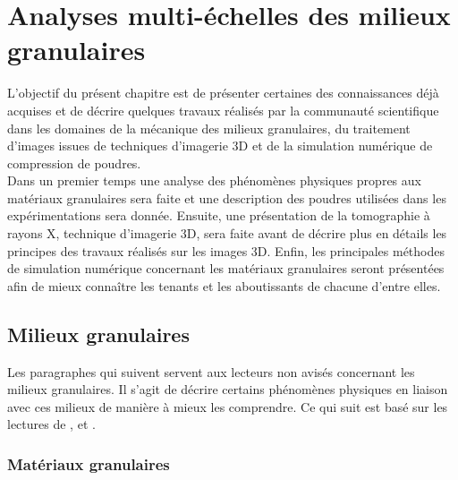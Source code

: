 \graphicspath{{./03-Biblio/images/}}

\chapter{Analyses multi-échelles des milieux granulaires}
\label{chap:biblio}


L'objectif du présent chapitre est de présenter certaines des connaissances déjà acquises et de décrire quelques travaux réalisés par la communauté scientifique dans les domaines de la mécanique des milieux granulaires, du traitement d'images issues de techniques d'imagerie 3D et de la simulation numérique de compression de poudres.
\\Dans un premier temps une analyse des phénomènes physiques propres aux matériaux granulaires sera faite et une description des poudres utilisées dans les expérimentations sera donnée. Ensuite, une présentation de la tomographie à rayons X, technique d'imagerie 3D, sera faite avant de décrire plus en détails les principes des travaux réalisés sur les images 3D. Enfin, les principales méthodes de simulation numérique concernant les matériaux granulaires seront présentées afin de mieux connaître les tenants et les aboutissants de chacune d'entre elles.

\section{Milieux granulaires}
	Les paragraphes qui suivent servent aux lecteurs non avisés concernant les milieux granulaires. Il s'agit de décrire certains phénomènes physiques en liaison avec ces milieux de manière à mieux les comprendre. Ce qui suit est basé sur les lectures de \citet{mollon_mecanique_2015}, \citet[Chapitres 1, 4 et 5]{matuttis_understanding_2014} et \citet{cambou_micromechanics_2009}.
	\subsection{Matériaux granulaires}
